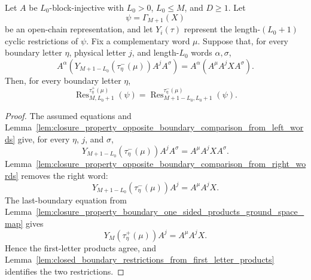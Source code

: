 \begin{theorem}
    \label{thm:closure_property_boundary_restrictions_ground_space_map_left_words}
    \leanok
    Let $A$ be $L_0$-block-injective with $L_0>0$, $L_0\le M$, and
    $D\ge1$. Let
    \[
        \psi=\Gamma_{M+1}(X)
    \]
    be an open-chain representation, and let $Y_i(\tau)$ represent the
    length-$(L_0+1)$ cyclic restrictions of $\psi$. Fix a complementary word
    $\mu$. Suppose that, for every boundary letter $\eta$, physical letter $j$,
    and length-$L_0$ words $\alpha,\sigma$,
    \[
        A^\alpha
        \left(Y_{M+1-L_0}(\tau^-_\eta(\mu))A^jA^\sigma\right)
        =
        A^\alpha
        \left(A^\mu A^jXA^\sigma\right).
    \]
    Then, for every boundary letter $\eta$,
    \[
        \operatorname{Res}^{\tau^+_\eta(\mu)}_{M,L_0+1}(\psi)
        =
        \operatorname{Res}^{\tau^-_\eta(\mu)}_{M+1-L_0,L_0+1}(\psi).
    \]
\end{theorem}

\begin{proof}
    \leanok
    The assumed equations and
    Lemma~\ref{lem:closure_property_opposite_boundary_comparison_from_left_words}
    give, for every $\eta$, $j$, and $\sigma$,
    \[
        Y_{M+1-L_0}(\tau^-_\eta(\mu))A^jA^\sigma
        =
        A^\mu A^jXA^\sigma .
    \]
    Lemma~\ref{lem:closure_property_opposite_boundary_comparison_from_right_words}
    removes the right word:
    \[
        Y_{M+1-L_0}(\tau^-_\eta(\mu))A^j
        =
        A^\mu A^jX .
    \]
    The last-boundary equation from
    Lemma~\ref{lem:closure_property_boundary_one_sided_products_ground_space_map}
    gives
    \[
        Y_M(\tau^+_\eta(\mu))A^j=A^\mu A^jX .
    \]
    Hence the first-letter products agree, and
    Lemma~\ref{lem:closed_boundary_restrictions_from_first_letter_products}
    identifies the two restrictions.
\end{proof}

